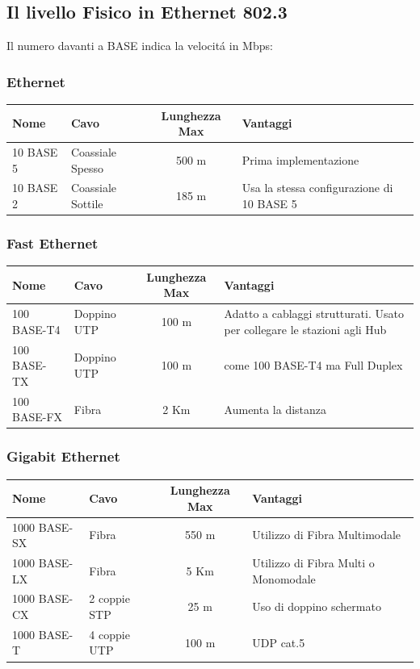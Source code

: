 \documentclass[12pt]{article}
\begin{document}
\clearpage
\subsection{Il livello Fisico in Ethernet 802.3}\label{ieee-802-livello-fisico-in-802.3}
Il numero davanti a BASE indica la velocit\'a in Mbps:
\subsubsection{Ethernet}\label{ieee-802-livello-fisico-in-802.3-ethernet}
\begin{tabular}{ m{4cm} | m{3cm} | c | m{5cm}}
    \textbf{Nome} & \textbf{Cavo} & \textbf{Lunghezza Max} & \textbf{Vantaggi} \\[2pt]\hline
    10 BASE 5 & Coassiale Spesso & 500 m & Prima implementazione \\[2pt]\hline
    10 BASE 2 & Coassiale Sottile & 185 m & Usa la stessa configurazione di 10 BASE 5 \\[2pt]\hline
\end{tabular}
\subsubsection{Fast Ethernet}\label{ieee-802-livello-fisico-in-802.3-fast-ethernet}
\begin{tabular}{ m{4cm} | m{3cm} | c | m{5cm}}
    \textbf{Nome} & \textbf{Cavo} & \textbf{Lunghezza Max} & \textbf{Vantaggi} \\[2pt]\hline
    100 BASE-T4 & Doppino UTP & 100 m & Adatto a cablaggi strutturati. Usato per collegare le stazioni agli Hub\\[2pt]\hline
    100 BASE-TX & Doppino UTP & 100 m & come 100 BASE-T4 ma Full Duplex \\[2pt]\hline
    100 BASE-FX & Fibra & 2 Km & Aumenta la distanza \\[2pt]\hline
\end{tabular}
\subsubsection{Gigabit Ethernet}\label{ieee-802-livello-fisico-in-802.3-gigabit-ethernet}
\begin{tabular}{ m{4cm} | m{3cm} | c | m{5cm}}
    \textbf{Nome} & \textbf{Cavo} & \textbf{Lunghezza Max} & \textbf{Vantaggi} \\[2pt]\hline
    1000 BASE-SX & Fibra & 550 m & Utilizzo di Fibra Multimodale \\[2pt]\hline
    1000 BASE-LX & Fibra & 5 Km & Utilizzo di Fibra Multi o Monomodale\\[2pt]\hline
    1000 BASE-CX & 2 coppie STP & 25 m & Uso di doppino schermato\\[2pt]\hline
    1000 BASE-T & 4 coppie UTP & 100 m & UDP cat.5\\[2pt]\hline
\end{tabular}
\end{document}
